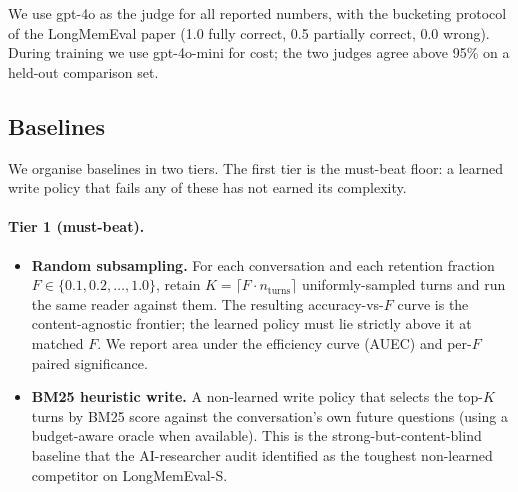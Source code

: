 \documentclass[11pt]{article}
\begin{document}
We use gpt-4o as the judge for all reported numbers, with the bucketing
protocol of the LongMemEval paper (1.0 fully correct, 0.5 partially
correct, 0.0 wrong). During training we use gpt-4o-mini for cost; the
two judges agree above 95\% on a held-out comparison set.

\subsection{Baselines}

We organise baselines in two tiers. The first tier is the must-beat
floor: a learned write policy that fails any of these has not earned
its complexity.

\paragraph{Tier 1 (must-beat).}
\begin{itemize}
  \item \textbf{Random subsampling.} For each conversation and each
    retention fraction $F \in \{0.1, 0.2, \ldots, 1.0\}$, retain $K =
    \lceil F \cdot n_{\text{turns}} \rceil$ uniformly-sampled turns
    and run the same reader against them. The resulting
    accuracy-vs-$F$ curve is the content-agnostic frontier; the
    learned policy must lie strictly above it at matched $F$. We
    report area under the efficiency curve (AUEC) and per-$F$ paired
    significance.
  \item \textbf{BM25 heuristic write.} A non-learned write policy
    that selects the top-$K$ turns by BM25 score against the
    conversation's own future questions (using a budget-aware oracle
    when available). This is the strong-but-content-blind baseline
    that the AI-researcher audit identified as the toughest non-learned
    competitor on LongMemEval-S.
\end{itemize}
\end{document}
